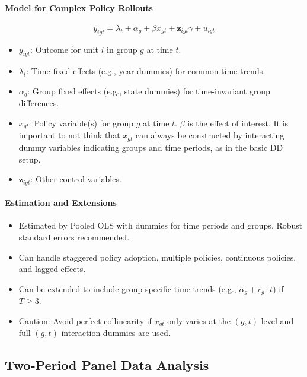 \documentclass[a4paper, 10pt]{article}
\theoremstyle{definition}	%
\begin{document}
\paragraph{Model for Complex Policy Rollouts} %
\[ y_{igt} = \lambda_t + \alpha_g + \beta x_{gt} + \mathbf{z}_{igt}\gamma + u_{igt} \]
\begin{itemize}
    \item \(y_{igt}\): Outcome for unit \(i\) in group \(g\) at time \(t\).
    \item \(\lambda_t\): Time fixed effects (e.g., year dummies) for common time trends.
    \item \(\alpha_g\): Group fixed effects (e.g., state dummies) for time-invariant group differences.
    \item \(x_{gt}\): Policy variable(s) for group \(g\) at time \(t\). \(\beta\) is the effect of interest. It is important to not think that $x_{gt}$ can always be constructed by interacting dummy variables indicating groups and time periods, as in the basic DD setup.
    \item \(\mathbf{z}_{igt}\): Other control variables.
\end{itemize}
\paragraph{Estimation and Extensions} %
\begin{itemize}
    \item Estimated by Pooled OLS with dummies for time periods and groups. Robust standard errors recommended.
    \item Can handle staggered policy adoption, multiple policies, continuous policies, and lagged effects.
    \item Can be extended to include group-specific time trends (e.g., \(\alpha_g + c_g \cdot t\)) if \(T \ge 3\).
    \item Caution: Avoid perfect collinearity if \(x_{gt}\) only varies at the \((g,t)\) level and full \((g,t)\) interaction dummies are used.
\end{itemize}

\subsection{Two-Period Panel Data Analysis}
\end{document}
